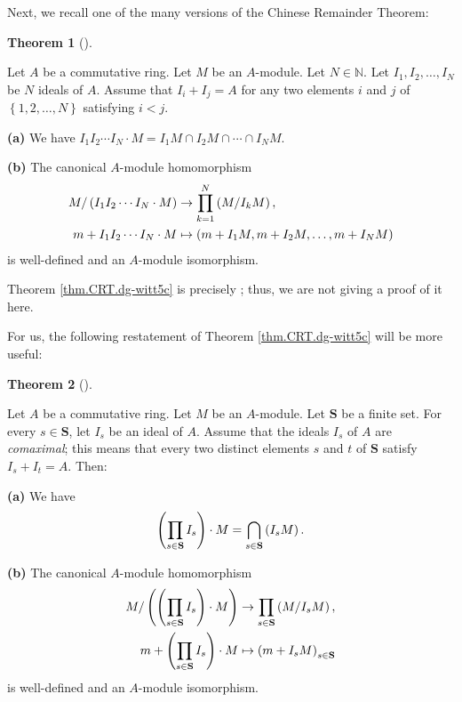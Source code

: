\documentclass[numbers=enddot,12pt,final,onecolumn,notitlepage]{scrartcl}%
\theoremstyle{definition}
\newtheorem{theo}{Theorem}[section]
\newenvironment{theorem}[1][]
{\begin{theo}[#1]\begin{leftbar}}
{\end{leftbar}\end{theo}}
\let\prodnonlimits\prod
\renewcommand{\prod}{\prodnonlimits\limits}
\begin{document}
Next, we recall one of the many versions of the Chinese Remainder Theorem:

\begin{theorem}
\label{thm.CRT.dg-witt5c}Let $A$ be a commutative ring. Let $M$ be an
$A$-module. Let $N\in\mathbb{N}$. Let $I_{1},I_{2},\ldots,I_{N}$ be $N$ ideals
of $A$. Assume that $I_{i}+I_{j}=A$ for any two elements $i$ and $j$ of
$\left\{  1,2,\ldots,N\right\}  $ satisfying $i<j$.

\textbf{(a)} We have $I_{1}I_{2}\cdots I_{N}\cdot M=I_{1}M\cap I_{2}%
M\cap\cdots\cap I_{N}M$.

\textbf{(b)} The canonical $A$-module homomorphism
\begin{align*}
M/\left(  I_{1}I_{2}\cdots I_{N}\cdot M\right)   &  \rightarrow\prod
\limits_{k=1}^{N}\left(  M/I_{k}M\right)  ,\\
m+I_{1}I_{2}\cdots I_{N}\cdot M  &  \mapsto\left(  m+I_{1}M,m+I_{2}%
M,\ldots,m+I_{N}M\right)
\end{align*}
is well-defined and an $A$-module isomorphism.
\end{theorem}

Theorem \ref{thm.CRT.dg-witt5c} is precisely \cite[Theorem 1 \textbf{(a)} and
\textbf{(b)}]{dg-witt5c}; thus, we are not giving a proof of it here.

For us, the following restatement of Theorem \ref{thm.CRT.dg-witt5c} will be
more useful:

\begin{theorem}
\label{thm.CRT}Let $A$ be a commutative ring. Let $M$ be an $A$-module. Let
$\mathbf{S}$ be a finite set. For every $s\in\mathbf{S}$, let $I_{s}$ be an
ideal of $A$. Assume that the ideals $I_{s}$ of $A$ are \textit{comaximal};
this means that every two distinct elements $s$ and $t$ of $\mathbf{S}$
satisfy $I_{s}+I_{t}=A$. Then:

\textbf{(a)} We have
\[
\left(  \prod\limits_{s\in\mathbf{S}}I_{s}\right)  \cdot M=\bigcap
_{s\in\mathbf{S}}\left(  I_{s}M\right)  .
\]


\textbf{(b)} The canonical $A$-module homomorphism
\begin{align*}
M/\left(  \left(  \prod\limits_{s\in\mathbf{S}}I_{s}\right)  \cdot M\right)
&  \rightarrow\prod\limits_{s\in\mathbf{S}}\left(  M/I_{s}M\right)  ,\\
m+\left(  \prod\limits_{s\in\mathbf{S}}I_{s}\right)  \cdot M  &
\mapsto\left(  m+I_{s}M\right)  _{s\in\mathbf{S}}%
\end{align*}
is well-defined and an $A$-module isomorphism.
\end{theorem}
\end{document}
